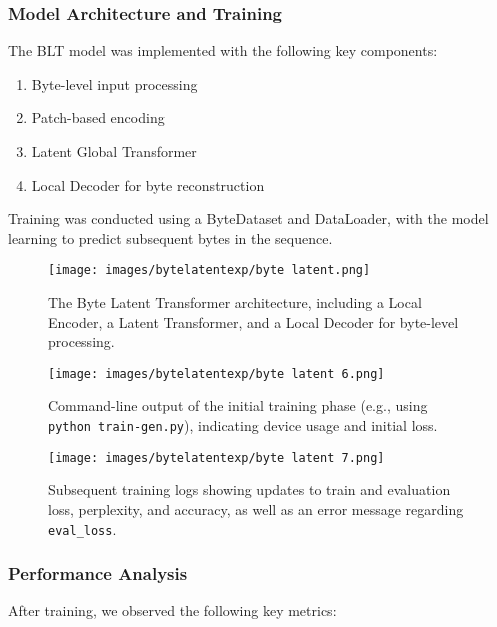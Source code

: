 \documentclass[a4paper, 11pt, twoside, openright]{report}
\begin{document}
\subsubsection{Model Architecture and Training}

The BLT model was implemented with the following key components:

\begin{enumerate}[label=\arabic*.]
    \item Byte-level input processing
    \item Patch-based encoding
    \item Latent Global Transformer
    \item Local Decoder for byte reconstruction
\end{enumerate}

Training was conducted using a ByteDataset and DataLoader, with the model learning to predict subsequent bytes in the sequence.

\begin{figure}[h!]
\centering
\texttt{[image: images/bytelatentexp/byte latent.png]}
\caption{The Byte Latent Transformer architecture, including a Local Encoder, a Latent Transformer, and a Local Decoder for byte-level processing.}
\label{fig:blt_architecture}
\end{figure}

\begin{figure}[h!]
\centering
\texttt{[image: images/bytelatentexp/byte latent 6.png]}
\caption{Command-line output of the initial training phase (e.g., using \texttt{python train-gen.py}), indicating device usage and initial loss.}
\label{fig:training_log1}
\end{figure}

\begin{figure}[h!]
\centering
\texttt{[image: images/bytelatentexp/byte latent 7.png]}
\caption{Subsequent training logs showing updates to train and evaluation loss, perplexity, and accuracy, as well as an error message regarding \texttt{eval\_loss}.}
\label{fig:training_log2}
\end{figure}

\subsubsection{Performance Analysis}

After training, we observed the following key metrics:
\end{document}

